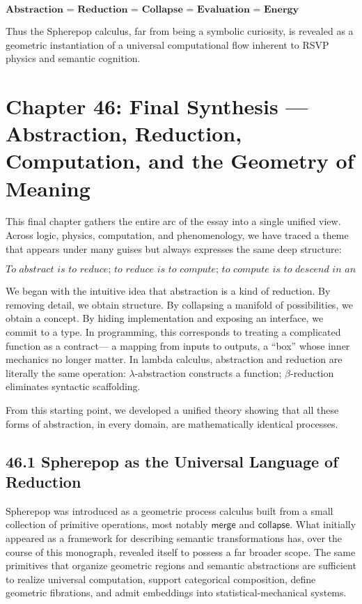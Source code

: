 \documentclass[12pt,letterpaper]{article}
\theoremstyle{remark}
\begin{document}
\[
\boxed{
\textbf{
Abstraction = Reduction = Collapse = Evaluation = 
Energy Minimization = Semantic Convergence.}}
\]

Thus the Spherepop calculus, far from being a symbolic curiosity,
is revealed as a geometric instantiation of a universal computational flow
inherent to RSVP physics and semantic cognition.

\newpage

\section{Chapter 46: Final Synthesis —  
Abstraction, Reduction, Computation, and the Geometry of Meaning}

This final chapter gathers the entire arc of the essay into a single unified view.  
Across logic, physics, computation, and phenomenology, we have traced a theme that 
appears under many guises but always expresses the same deep structure:

\[
\boxed{
\textit{To abstract is to reduce;  
to reduce is to compute;  
to compute is to descend in an energy landscape;  
to descend is to align with meaning.}}
\]

We began with the intuitive idea that abstraction is a kind of reduction.  
By removing detail, we obtain structure.  
By collapsing a manifold of possibilities, we obtain a concept.  
By hiding implementation and exposing an interface, we commit to a type.  
In programming, this corresponds to treating a complicated function as a contract—
a mapping from inputs to outputs, a “box” whose inner mechanics no longer matter.
In lambda calculus, abstraction and reduction are literally the same operation:
$\lambda$-abstraction constructs a function; $\beta$-reduction eliminates syntactic scaffolding.

From this starting point, we developed a unified theory showing that all these forms of
abstraction, in every domain, are mathematically identical processes.

\subsection{46.1 Spherepop as the Universal Language of Reduction}

Spherepop was introduced as a geometric process calculus built from a small collection of primitive operations, most notably $\mathsf{merge}$ and $\mathsf{collapse}$. What initially appeared as a framework for describing semantic transformations has, over the course of this monograph, revealed itself to possess a far broader scope. The same primitives that organize geometric regions and semantic abstractions are sufficient to realize universal computation, support categorical composition, define geometric fibrations, and admit embeddings into statistical-mechanical systems.
\end{document}
